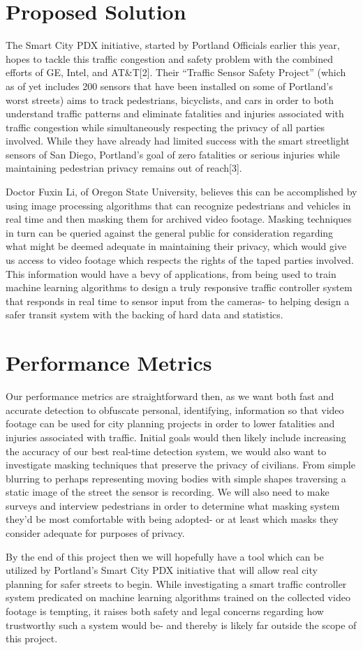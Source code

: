 \documentclass[letterpaper,10pt,draftclsnofoot,onecolumn]{IEEEtran}
\begin{document}
\section{Proposed Solution}
The Smart City PDX initiative, started by Portland Officials earlier this year, hopes to tackle this traffic congestion and safety problem with the combined efforts of GE, Intel, and AT\&T[2]. Their “Traffic Sensor Safety Project” (which as of yet includes 200 sensors that have been installed on some of Portland’s worst streets) aims to track pedestrians, bicyclists, and cars in order to both understand traffic patterns and eliminate fatalities and injuries associated with traffic congestion while simultaneously respecting the privacy of all parties involved. While they have already had limited success with the smart streetlight sensors of San Diego, Portland’s goal of zero fatalities or serious injuries while maintaining pedestrian privacy remains out of reach[3].\par
Doctor Fuxin Li, of Oregon State University, believes this can be accomplished by using image processing algorithms that can recognize pedestrians and vehicles in real time and then masking them for archived video footage. Masking techniques in turn can be queried against the general public for consideration regarding what might be deemed adequate in maintaining their privacy, which would give us access to video footage which respects the rights of the taped parties involved. This information would have a bevy of applications, from being used to train machine learning algorithms to design a truly responsive traffic controller system that responds in real time to sensor input from the cameras- to helping design a safer transit system with the backing of hard data and statistics.
\section{Performance Metrics}
Our performance metrics are straightforward then, as we want both fast and accurate detection to obfuscate personal, identifying, information so that video footage can be used for city planning projects in order to lower fatalities and injuries associated with traffic. Initial goals would then likely include increasing the accuracy of our best real-time detection system, we would also want to investigate masking techniques that preserve the privacy of civilians. From simple blurring to perhaps representing moving bodies with simple shapes traversing a static image of the street the sensor is recording. We will also need to make surveys and interview pedestrians in order to determine what masking system they’d be most comfortable with being adopted- or at least which masks they consider adequate for purposes of privacy.\par
By the end of this project then we will hopefully have a tool which can be utilized by Portland’s Smart City PDX initiative that will allow real city planning for safer streets to begin. While investigating a smart traffic controller system predicated on machine learning algorithms trained on the collected video footage is tempting, it raises both safety and legal concerns regarding how trustworthy such a system would be- and thereby is likely far outside the scope of this project.
\end{document}
